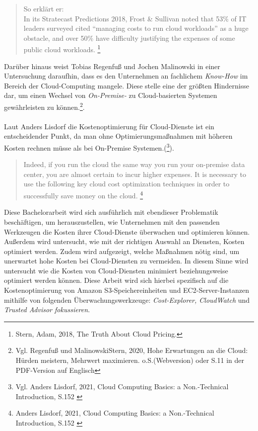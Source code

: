 \begin{quote}
    So erklärt er: \\
    In its Stratecast Predictions 2018, Frost \& Sullivan noted that 53\% of IT leaders surveyed cited “managing costs to run cloud workloads” as a huge obstacle, and over 50\% have difficulty justifying the expenses of some public cloud workloads.  
    \footnote{Stern, Adam, 2018, The Truth About Cloud Pricing.\cite{SP1}}
\end{quote}
Darüber hinaus weist Tobias Regenfuß und Jochen Malinowski in einer Untersuchung daraufhin, dass es den Unternehmen an fachlichem \textit{Know-How} im Bereich der Cloud-Computing mangele. Diese stelle eine der größten Hindernisse dar, um einen Wechsel von \textit{On-Premise-} zu Cloud-basierten Systemen gewährleisten zu können.\footnote{Vgl. Regenfuß und MalinowskiStern, 2020, Hohe Erwartungen an die Cloud: Hürden meistern, Mehrwert maximieren. o.S.(Webversion) oder S.11 in der PDF-Version auf Englisch\cite{ACC1}}.
\\\\
Laut Anders Lisdorf die Kostenoptimierung für Cloud-Dienste ist ein entscheidender Punkt, da man ohne Optimierungsmaßnahmen mit höheren Kosten rechnen müsse als bei On-Premise Systemen.(\footnote{Vgl. Anders Lisdorf, 2021, Cloud Computing Basics: a Non.-Technical Introduction, S.152 \cite{CCB}}).
\\
\begin{quote}
    Indeed, if you run the cloud the same way you run your on-premise data center, you are almost certain to incur higher expenses. It is necessary to use the following key cloud cost optimization techniques in order to successfully save money on the cloud.
    \footnote{Anders Lisdorf, 2021, Cloud Computing Basics: a Non.-Technical Introduction, S.152 \cite{CCB}}
\end{quote}
\begin{flushleft}
Diese Bachelorarbeit wird sich ausführlich mit ebendieser Problematik beschäftigen, um herauszustellen, wie Unternehmen mit den passenden Werkzeugen die Kosten ihrer Cloud-Dienste überwachen und optimieren können. %
Außerdem wird untersucht, wie mit der richtigen Auswahl an Diensten, Kosten optimiert werden. 
Zudem wird aufgezeigt, welche Maßnahmen nötig sind, um unerwartet hohe Kosten bei Cloud-Diensten zu vermeiden. In diesem Sinne wird untersucht %
wie die Kosten von Cloud-Diensten minimiert beziehungsweise optimiert werden können. Diese Arbeit wird sich hierbei spezifisch auf die Kostenoptimierung  von Amazon S3-Speichereinheiten und EC2-Server-Instanzen mithilfe von folgenden Überwachungswerkzeuge: \textit{Cost-Explorer, CloudWatch} und \textit{Trusted Advisor fokussieren}.
\end{flushleft}


